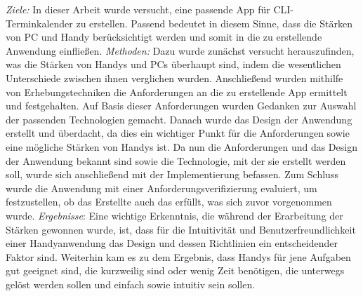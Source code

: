 %
%
%
%
%
%
%
%
\textit{Ziele:} In dieser Arbeit wurde versucht, eine passende App für CLI-Terminkalender zu erstellen. \glqq Passend\grqq{} bedeutet in diesem Sinne, dass die Stärken von PC und Handy berücksichtigt werden und somit in die zu erstellende Anwendung einfließen.
%
%
%
%
%
\newline%
\newline%
\textit{Methoden:} 
	Dazu wurde zunächst versucht herauszufinden, was die Stärken von Handys und PCs überhaupt sind, indem die wesentlichen Unterschiede zwischen ihnen verglichen wurden.
	Anschließend wurden mithilfe von Erhebungstechniken die Anforderungen an die zu erstellende App ermittelt und festgehalten.
	Auf Basis dieser Anforderungen wurden Gedanken zur Auswahl der passenden Technologien gemacht. 
	Danach wurde das Design der Anwendung erstellt und überdacht, da dies ein wichtiger Punkt für die Anforderungen sowie eine mögliche Stärken von Handys ist.
	Da nun die Anforderungen und das Design der Anwendung bekannt sind sowie die Technologie, mit der sie erstellt werden soll, wurde sich anschließend mit der Implementierung befassen.
	Zum Schluss wurde die Anwendung mit einer Anforderungsverifizierung evaluiert, um festzustellen, ob das Erstellte auch das erfüllt, was sich zuvor vorgenommen wurde.
%
%
%
% 
%
\newline%
\newline%
\textit{Ergebnisse}:
Eine wichtige Erkenntnis, die während der Erarbeitung der Stärken gewonnen wurde, ist, dass für die Intuitivität und Benutzerfreundlichkeit einer Handyanwendung das Design und dessen Richtlinien ein entscheidender Faktor sind. 
		Weiterhin kam es zu dem Ergebnis, dass Handys für jene Aufgaben gut geeignet sind, die kurzweilig sind oder wenig Zeit benötigen, die unterwegs gelöst werden sollen und einfach sowie intuitiv sein sollen. 
